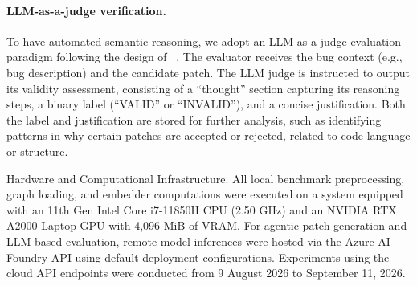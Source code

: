 \paragraph{LLM-as-a-judge verification.} To have automated semantic reasoning, we adopt an LLM-as-a-judge evaluation paradigm following the design of ~\cite{google2026llmjudge}.
The evaluator receives the bug context (e.g., bug description) and the candidate patch. The LLM judge is instructed to output its validity assessment, consisting of a “thought” section capturing its reasoning steps, a binary label (“VALID” or “INVALID”), and a concise justification. 
Both the label and justification are stored for further analysis, such as identifying patterns in why certain patches are accepted or rejected, related to code language or structure.

Hardware and Computational Infrastructure. All local benchmark preprocessing, graph loading, and embedder computations were executed on a system equipped with an 11th Gen Intel Core i7-11850H CPU (2.50 GHz) and an NVIDIA RTX A2000 Laptop GPU with 4,096 MiB of VRAM. For agentic patch generation and LLM-based evaluation, remote model inferences were hosted via the Azure AI Foundry API using default deployment configurations. Experiments using the cloud API endpoints were conducted from 9 August 2026 to September 11, 2026.
